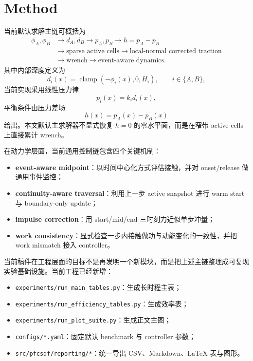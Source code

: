\section{Method}
当前默认求解主链可概括为
\begin{equation}
\begin{aligned}
\phi_A,\phi_B &\rightarrow d_A,d_B \rightarrow p_A,p_B \rightarrow h=p_A-p_B \\
&\rightarrow \text{sparse active cells} \rightarrow \text{local-normal corrected traction} \\
&\rightarrow \text{wrench} \rightarrow \text{event-aware dynamics}.
\end{aligned}
\end{equation}
其中内部深度定义为
\begin{equation}
    d_i(x)=\operatorname{clamp}(-\phi_i(x),0,H_i),\qquad i\in\{A,B\},
\end{equation}
当前实现采用线性压力律
\begin{equation}
    p_i(x)=k_i d_i(x),
\end{equation}
平衡条件由压力差场
\begin{equation}
    h(x)=p_A(x)-p_B(x)
\end{equation}
给出。本文默认主求解器不显式恢复 $h=0$ 的零水平面，而是在窄带 active cells 上直接累计 wrench。

在动力学层面，当前通用控制链包含四个关键机制：
\begin{itemize}
    \item \textbf{event-aware midpoint}：以时间中心化方式评估接触，并对 onset/release 做通用事件监控；
    \item \textbf{continuity-aware traversal}：利用上一步 active snapshot 进行 warm start 与 boundary-only update；
    \item \textbf{impulse correction}：用 start/mid/end 三时刻力近似单步冲量；
    \item \textbf{work consistency}：显式检查一步内接触做功与动能变化的一致性，并把 work mismatch 接入 controller。
\end{itemize}

当前稿件在工程层面的目标不是再发明一个新模块，而是把上述主链整理成可复现实验基础设施。当前工程已经新增：
\begin{itemize}
    \item \texttt{experiments/run\_main\_tables.py}：生成长时程主表；
    \item \texttt{experiments/run\_efficiency\_tables.py}：生成效率表；
    \item \texttt{experiments/run\_plot\_suite.py}：生成正文主图；
    \item \texttt{configs/*.yaml}：固定默认 benchmark 与 controller 参数；
    \item \texttt{src/pfcsdf/reporting/*}：统一导出 CSV、Markdown、LaTeX 表与图形。
\end{itemize}
